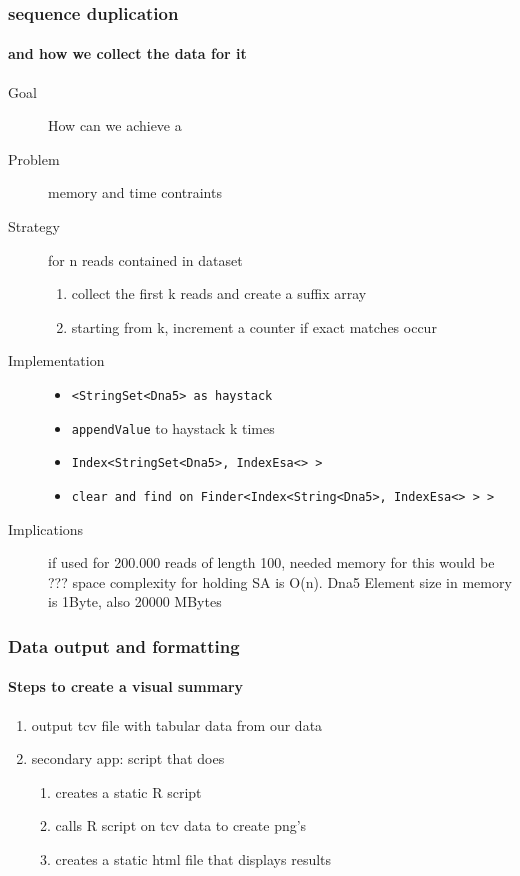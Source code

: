 \documentclass{beamer}
\begin{document}
\begin{frame}
 \frametitle{sequence duplication}
 \framesubtitle{and how we collect the data for it}
\begin{description}
 \item[Goal] How can we achieve a  
 \item[Problem] memory and time contraints
 \item[Strategy] for n reads contained in dataset 
    \begin{enumerate}
      \item collect the first k reads and create a suffix array
      \item starting from k, increment a counter if exact matches occur 
    \end{enumerate}
 \item[Implementation]
 \begin{itemize}
  \item \texttt{<StringSet<Dna5> as haystack}
  \item \texttt{appendValue} to haystack k times
  \item \texttt{Index<StringSet<Dna5>, IndexEsa<> >} 
  \item \texttt{clear and find on Finder<Index<String<Dna5>, IndexEsa<> > >}
 \end{itemize}
 \item[Implications] if used for 200.000 reads of length 100, needed memory for this would be ??? 
space complexity for holding SA is O(n). Dna5 Element size in memory is 1Byte, also 20000 MBytes
\end{description}


\end{frame}




\begin{frame}
 \frametitle{Data output and formatting}
 \framesubtitle{Steps to create a visual summary}
\begin{enumerate}
 \item output tcv file with tabular data from our data 
 \item secondary app: script that does
  \begin{enumerate}
   \item creates a static R script
   \item calls R script on tcv data to create png's
   \item creates a static html file that displays results   
  \end{enumerate}
\end{enumerate}
 
\end{frame}
\end{document}
